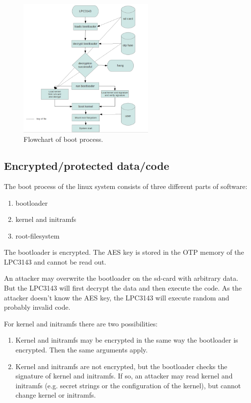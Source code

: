 \begin{figure}
  \begin{center}
    \includegraphics[width=0.6\textwidth]{diagram_key_files_flow.png}
  \end{center}
  \caption{Flowchart of boot process.}
\end{figure}

\subsection{Encrypted/protected data/code}

The boot process of the linux system consists of three different parts of software:
\begin{enumerate}
\item bootloader
\item kernel and initramfs
\item root-filesystem
\end{enumerate}

The bootloader is encrypted. The AES key is stored in the OTP memory of the
LPC3143 and cannot be read out.

An attacker may overwrite the bootloader on the sd-card with arbitrary data.
But the LPC3143 will first decrypt the data and then execute the code. As the
attacker doesn't know the AES key, the LPC3143 will execute random and probably
invalid code.

For kernel and initramfs there are two possibilities:
\begin{enumerate}
\item Kernel and initramfs may be encrypted in the same way the bootloader is
encrypted. Then the same arguments apply.
\item Kernel and initramfs are not encrypted, but the bootloader checks the
signature of kernel and initramfs. If so, an attacker may read kernel and
initramfs (e.g. secret strings or the configuration of the kernel), but cannot
change kernel or initramfs.
\end{enumerate}

